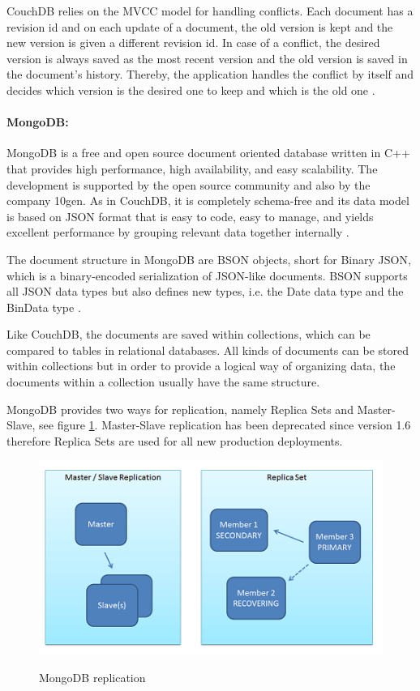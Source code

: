 CouchDB relies on the \ac{MVCC} model for handling conflicts. Each document has a revision id and on each update of a document, the old version is kept and the new version is given a different revision id. In case of a conflict, the desired version is always saved as the most recent version and the old version is saved in the document's history. Thereby, the application handles the conflict by itself and decides which version is the desired one to keep and which is the old one \cite{books:daglib:0024051}.

\paragraph{MongoDB:\label{sec:back_mongo}}
MongoDB is a free and open source document oriented database written in C++ that provides high performance, high availability, and easy scalability. The development is supported by the open source community and also by the company 10gen. As in CouchDB, it is completely schema-free and its data model is based on \ac{JSON} format  that is easy to code, easy to manage, and yields excellent performance by grouping relevant data together internally \cite{mongodb_intro}. 

The document structure in MongoDB are BSON objects, short for Binary \ac{JSON}, which is a binary-encoded serialization of \ac{JSON}-like documents.  \ac{BSON} supports all \ac{JSON} data types but also defines new types, i.e. the Date data type and the BinData type \cite{bson_intro}.

Like CouchDB, the documents are saved within collections, which can be compared to tables in relational databases. All kinds of documents can be stored within collections but in order to provide a logical way of organizing data, the documents within a collection usually have the same structure.

MongoDB provides two ways for replication, namely Replica Sets and Master-Slave, see figure \ref{fig:mongodb_repl}. Master-Slave replication has been deprecated since version 1.6 therefore Replica Sets are used for all new production deployments.

\begin{figure}[htb]
  \centering
  \includegraphics{mongodb_repl.png}\\
  \caption{MongoDB replication}
  \label{fig:mongodb_repl}
  \protect\cite{mongodb_replication}
\end{figure}

